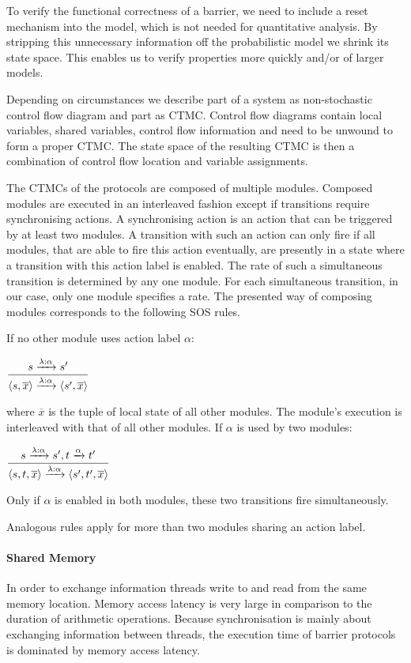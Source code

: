 \documentclass[a4paper, 10pt]{article}
\begin{document}
To verify the functional correctness of a barrier, we need to include a reset mechanism into the model, which is not needed for quantitative analysis. By stripping this unnecessary information off the probabilistic model we shrink its state space. This enables us to verify properties more quickly and/or of larger models.

Depending on circumstances we describe part of a system as non-stochastic control flow diagram and part as CTMC. Control flow diagrams contain local variables, shared variables, control flow information and need to be unwound to form a proper CTMC. The state space of the resulting CTMC is then a combination of control flow location and variable assignments.

The CTMCs of the protocols are composed of multiple modules.
Composed modules are executed in an interleaved fashion except if transitions require synchronising actions. A synchronising action is an action that can be triggered by at least two modules. A transition with such an action can only fire if all modules, that are able to fire this action eventually, are presently in a state where a transition with this action label is enabled. The rate of such a simultaneous transition is determined by any one module. For each simultaneous transition, in our case, only one module specifies a rate.
The presented way of composing modules corresponds to the following SOS rules.

If no other module uses action label $\alpha$:
\begin{center}
	$\mathlarger{\frac{s \xrightarrow{\lambda : \alpha} s'}{\langle s , \overline{x} \rangle \xrightarrow{\lambda : \alpha} \langle s', \overline{x} \rangle}}$
\end{center}
where $\overline{x}$ is the tuple of local state of all other modules. The module's execution is interleaved with that of all other modules.
If $\alpha$ is used by two modules:
\begin{center}
	$\mathlarger{\frac{s \xrightarrow{\lambda : \alpha} s', t \xrightarrow{\alpha} t'}{\langle s, t , \overline{x} \rangle \xrightarrow{\lambda : \alpha} \langle s', t', \overline{x} \rangle}}$
\end{center}
Only if $\alpha$ is enabled in both modules, these two transitions fire simultaneously.

Analogous rules apply for more than two modules sharing an action label.

\paragraph{Shared Memory}
\label{sssec:analysis-modelchecking-modelling-shared-memory}
In order to exchange information threads write to and read from the same memory location.
Memory access latency is very large in comparison to the duration of arithmetic operations.
Because synchronisation is mainly about exchanging information between threads, the execution time of barrier protocols is dominated by memory access latency.
\end{document}

